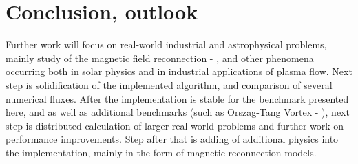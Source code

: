 \chapter{Conclusion, outlook}
Further work will focus on real-world industrial and astrophysical problems, mainly study of the magnetic field reconnection - \cite{reconnection}, and other phenomena occurring both in solar physics and in industrial applications of plasma flow. Next step is solidification of the implemented algorithm, and comparison of several numerical fluxes. After the implementation is stable for the benchmark presented here, and as well as additional benchmarks (such as Orszag-Tang Vortex - \cite{vortex}), next step is distributed calculation of larger real-world problems and further work on performance improvements. Step after that is adding of additional physics into the implementation, mainly in the form of magnetic reconnection models.